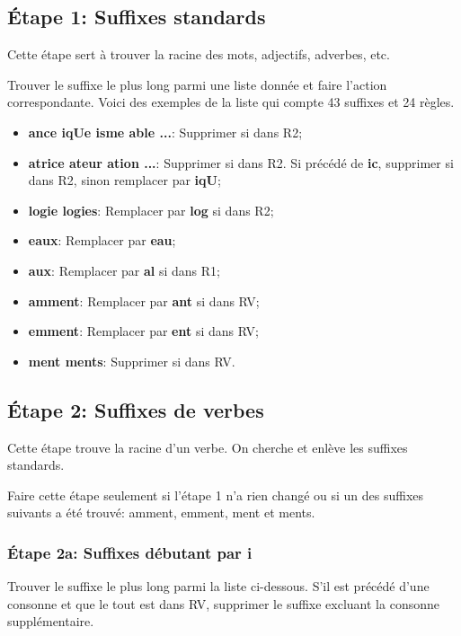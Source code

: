 \subsection*{Étape 1: Suffixes standards}

Cette étape sert à trouver la racine des mots, adjectifs, adverbes, etc.

Trouver le suffixe le plus long parmi une liste donnée et faire l'action correspondante.
Voici des exemples de la liste qui compte 43 suffixes et 24 règles.

\begin{itemize}
  \item \textbf{ance iqUe isme able ...}: Supprimer si dans R2;
  \item \textbf{atrice ateur ation ...}: Supprimer si dans R2. Si précédé de \textbf{ic}, supprimer si dans R2, sinon remplacer par \textbf{iqU};
  \item \textbf{logie logies}: Remplacer par \textbf{log} si dans R2;
  \item \textbf{eaux}: Remplacer par \textbf{eau};
  \item \textbf{aux}: Remplacer par \textbf{al} si dans R1;
  \item \textbf{amment}: Remplacer par \textbf{ant} si dans RV;
  \item \textbf{emment}: Remplacer par \textbf{ent} si dans RV;
  \item \textbf{ment ments}: Supprimer si dans RV.
\end{itemize}

\subsection*{Étape 2: Suffixes de verbes}

Cette étape trouve la racine d'un verbe.
On cherche et enlève les suffixes standards.

Faire cette étape seulement si l'étape 1 n'a rien changé ou si un des suffixes suivants a été trouvé: amment, emment, ment et ments.

\subsubsection*{Étape 2a: Suffixes débutant par i}

Trouver le suffixe le plus long parmi la liste ci-dessous.
S'il est précédé d'une consonne et que le tout est dans RV, supprimer le suffixe excluant la consonne supplémentaire.

